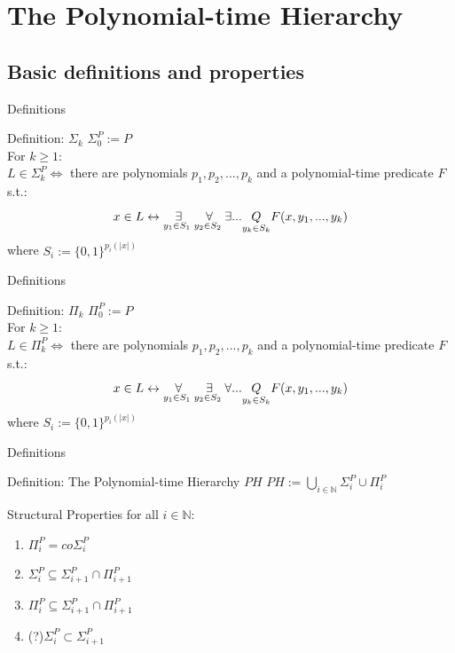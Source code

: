 \section{The Polynomial-time Hierarchy}
    \subsection{Basic definitions and properties}
        \begin{frame}{Definitions}
            \begin{block}{Definition: $\Sigma_k$}
                $ \Sigma_0^P := P$\\
                For $k\geq 1:$ \\
                $L \in \Sigma_k^P \iff $ there are polynomials $p_1, p_2,..., p_k$ and a polynomial-time predicate $F$ s.t.:
                $$x \in L \leftrightarrow 
                    \overset{{}}{\underset{{y_1 \in S_1\text{ }}}{\Large \exists}}
                    \overset{{}}{\underset{{y_2 \in S_2\text{ }}}{\Large \forall}}
                    \exists ...\underset{y_k \in S_k}{Q} F(x,y_1,...,y_k)$$
                where $S_i := \{0,1\}^{p_i(|x|)}$  
            \end{block}
        \end{frame}
        \begin{frame}{Definitions}
            \begin{block}{Definition: $\Pi_k$}
                $ \Pi_0^P := P$\\
                For $k\geq 1:$ \\
                $L \in \Pi_k^P \iff $ there are polynomials $p_1, p_2,..., p_k$ and a polynomial-time predicate $F$ s.t.:
                $$x \in L \leftrightarrow 
                    \overset{{}}{\underset{{y_1 \in S_1\text{ }}}{\Large \forall}}
                    \overset{{}}{\underset{{y_2 \in S_2\text{ }}}{\Large \exists}}
                    \forall ...\underset{y_k \in S_k}{Q} F(x,y_1,...,y_k)$$
                where $S_i := \{0,1\}^{p_i(|x|)}$  
            \end{block}
        \end{frame}

        
        \begin{frame}{Definitions}
            \begin{block}{Definition: The Polynomial-time Hierarchy $PH$}
            $PH := \bigcup_{i \in \mathbb{N}} \Sigma_i^P \cup \Pi_i^P $
            \end{block}
        \end{frame}
    
        \begin{frame}{Structural Properties}  
            for all $i\in \mathbb{N}$: 
            \begin{enumerate}
                \item $\Pi_i^P = co\Sigma_i^P $
                \pause
                \item $\Sigma_i^P \subseteq \Sigma_{i+1}^P \cap \Pi_{i+1}^P$
                \item $\Pi_i^P \subseteq \Sigma_{i+1}^P \cap \Pi_{i+1}^P$
                \pause
                \item (?)$\Sigma_i^P \subset \Sigma_{i+1}^P$
            \end{enumerate}
        \end{frame}

